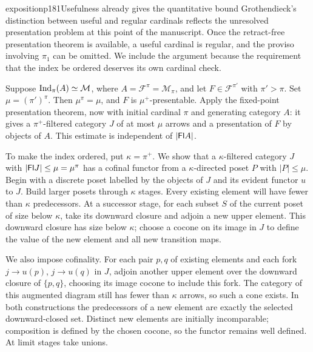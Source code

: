 \begin{dcomment}{exposition}{p181}{Usefulness already gives the quantitative bound}
Grothendieck's distinction between useful and regular cardinals reflects the unresolved presentation problem at this point of the manuscript. Once the retract-free presentation theorem is available, a useful cardinal is regular, and the proviso involving $\pi_1$ can be omitted. We include the argument because the requirement that the index be ordered deserves its own cardinal check.

Suppose $\operatorname{Ind}_\pi(A)\simeq\mathcal M$, where $A=\mathcal F^\pi=\mathcal M_\pi$, and let $F\in\mathcal F^{\pi'}$ with $\pi'>\pi$. Set $\mu=(\pi')^\pi$. Then $\mu^\pi=\mu$, and $F$ is $\mu^+$-presentable. Apply the fixed-point presentation theorem, now with initial cardinal $\pi$ and generating category $A$: it gives a $\pi^+$-filtered category $J$ of at most $\mu$ arrows and a presentation of $F$ by objects of $A$. This estimate is independent of $|\mathsf{Fl} A|$.

To make the index ordered, put $\kappa=\pi^+$. We show that a $\kappa$-filtered category $J$ with $|\mathsf{Fl} J|\leq\mu=\mu^\pi$ has a cofinal functor from a $\kappa$-directed poset $P$ with $|P|\leq\mu$. Begin with a discrete poset labelled by the objects of $J$ and its evident functor $u$ to $J$. Build larger posets through $\kappa$ stages. Every existing element will have fewer than $\kappa$ predecessors. At a successor stage, for each subset $S$ of the current poset of size below $\kappa$, take its downward closure and adjoin a new upper element. This downward closure has size below $\kappa$; choose a cocone on its image in $J$ to define the value of the new element and all new transition maps.

We also impose cofinality. For each pair $p,q$ of existing elements and each fork $j\to u(p)$, $j\to u(q)$ in $J$, adjoin another upper element over the downward closure of $\{p,q\}$, choosing its image cocone to include this fork. The category of this augmented diagram still has fewer than $\kappa$ arrows, so such a cone exists. In both constructions the predecessors of a new element are exactly the selected downward-closed set. Distinct new elements are initially incomparable; composition is defined by the chosen cocone, so the functor remains well defined. At limit stages take unions.


\end{dcomment}
